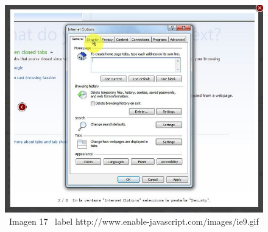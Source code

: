 \documentclass[11pt]{article} %
\begin{document}
\begin{figure}
\begin{center}
\includegraphics[height=8 cm, width=8 cm] {imagenes/explorer 02.jpg}
\newline
\newline
\ Imagen 17
\ label {http://www.enable-javascript.com/images/ie9.gif }

\end{center}
\end{figure}
\end{document}
